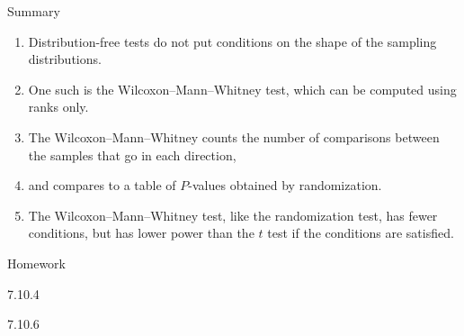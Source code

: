 \begin{frame}{Summary}
  \begin{enumerate}
    \item Distribution-free tests do not put conditions on the shape of the sampling distributions.
    \item One such is the Wilcoxon--Mann--Whitney test, which can be computed using ranks only.
    \item The Wilcoxon--Mann--Whitney counts the number of comparisons between the samples that go in each direction, 
    \item and compares to a table of $P$-values obtained by randomization.
    \item The Wilcoxon--Mann--Whitney test, like the randomization test, has fewer conditions, but has lower power than the $t$ test if the conditions are satisfied.
  \end{enumerate}
\end{frame}

\begin{frame}{Homework}
  \begin{center}

  7.10.4

  \vspace{2em}

  7.10.6

  \end{center}
\end{frame}








